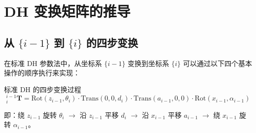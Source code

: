 \chapter{DH 变换矩阵的推导}

\section{从 $\{i-1\}$ 到 $\{i\}$ 的四步变换}

在标准 DH 参数法中，从坐标系 $\{i-1\}$ 变换到坐标系 $\{i\}$ 可以通过以下四个基本操作的顺序执行来实现：

\begin{myTheorem}{标准 DH 的四步变换过程}
	\[
	{}^{i-1}_{i}\mathbf{T} = \mathrm{Rot}(z_{i-1}, \theta_i) \cdot \mathrm{Trans}(0,0,d_i) \cdot \mathrm{Trans}(a_{i-1},0,0) \cdot \mathrm{Rot}(x_{i-1}, \alpha_{i-1})
	\]
	
	即：绕 $z_{i-1}$ 旋转 $\theta_i$ $\to$ 沿 $z_{i-1}$ 平移 $d_i$ $\to$ 沿 $x_{i-1}$ 平移 $a_{i-1}$ $\to$ 绕 $x_{i-1}$ 旋转 $\alpha_{i-1}$。
\end{myTheorem}

